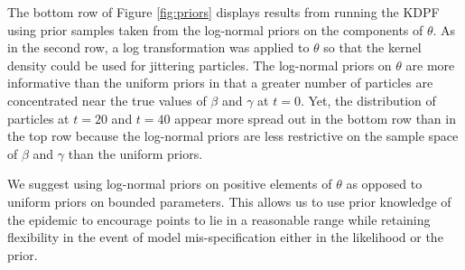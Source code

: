 \documentclass{elsarticle}
\begin{document}
The bottom row of Figure \ref{fig:priors} displays results from running the KDPF using prior samples taken from the log-normal priors on the components of $\theta$. As in the second row, a log transformation was applied to $\theta$ so that the kernel density could be used for jittering particles. The log-normal priors on $\theta$ are more informative than the uniform priors in that a greater number of particles are concentrated near the true values of $\beta$ and $\gamma$ at $t = 0$. Yet, the distribution of particles at $t = 20$ and $t = 40$ appear more spread out in the bottom row than in the top row because the log-normal priors are less restrictive on the sample space of $\beta$ and $\gamma$ than the uniform priors.

We suggest using log-normal priors on positive elements of $\theta$ as opposed to uniform priors on bounded parameters. This allows us to use prior knowledge of the epidemic to encourage points to lie in a reasonable range while retaining flexibility in the event of model mis-specification either in the likelihood or the prior.
\end{document}
